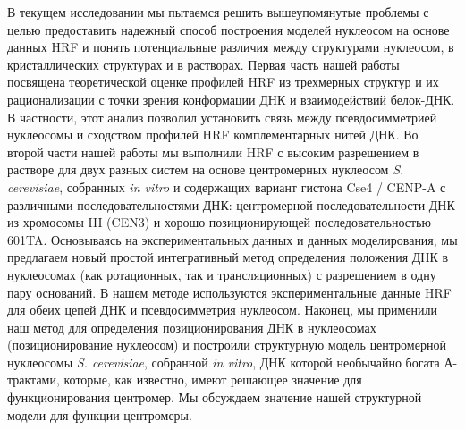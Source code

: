 В текущем исследовании мы пытаемся решить вышеупомянутые проблемы с целью предоставить надежный способ построения моделей нуклеосом на основе данных HRF и понять потенциальные различия между структурами нуклеосом, в кристаллических структурах и в растворах. Первая часть нашей работы посвящена теоретической оценке профилей HRF из трехмерных структур и их рационализации с точки зрения конформации ДНК и взаимодействий белок-ДНК. В частности, этот анализ позволил установить связь между псевдосимметрией нуклеосомы и сходством профилей HRF комплементарных нитей ДНК. Во второй части нашей работы мы выполнили HRF с высоким разрешением в растворе для двух разных систем на основе центромерных нуклеосом \textit{S. cerevisiae}, собранных \textit{in vitro} и содержащих вариант гистона Cse4 / CENP-A с различными последовательностями ДНК: центромерной последовательности ДНК из хромосомы III (CEN3) и хорошо позиционирующей последовательностью 601TA. Основываясь на экспериментальных данных и данных моделирования, мы предлагаем новый простой интегративный метод определения положения ДНК в нуклеосомах (как ротационных, так и трансляционных) с разрешением в одну пару оснований. В нашем методе используются экспериментальные данные HRF для обеих цепей ДНК и псевдосимметрия нуклеосом. Наконец, мы применили наш метод для определения позиционирования ДНК в нуклеосомах (позиционирование нуклеосом) и построили структурную модель центромерной нуклеосомы \textit{S. cerevisiae}, собранной \textit{in vitro}, ДНК которой необычайно богата А-трактами, которые, как известно, имеют решающее значение для функционирования центромер. Мы обсуждаем значение нашей структурной модели для функции центромеры.

